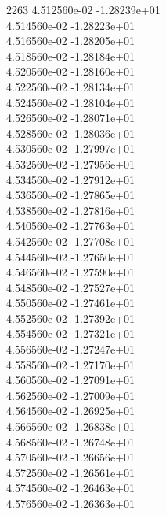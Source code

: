 2263	4.512560e-02	-1.28239e+01	\\ 	4.514560e-02	-1.28223e+01	\\ 	4.516560e-02	-1.28205e+01	\\ 	4.518560e-02	-1.28184e+01	\\ 	4.520560e-02	-1.28160e+01	\\ 	4.522560e-02	-1.28134e+01	\\ 	4.524560e-02	-1.28104e+01	\\ 	4.526560e-02	-1.28071e+01	\\ 	4.528560e-02	-1.28036e+01	\\ 	4.530560e-02	-1.27997e+01	\\ 	4.532560e-02	-1.27956e+01	\\ 	4.534560e-02	-1.27912e+01	\\ 	4.536560e-02	-1.27865e+01	\\ 	4.538560e-02	-1.27816e+01	\\ 	4.540560e-02	-1.27763e+01	\\ 	4.542560e-02	-1.27708e+01	\\ 	4.544560e-02	-1.27650e+01	\\ 	4.546560e-02	-1.27590e+01	\\ 	4.548560e-02	-1.27527e+01	\\ 	4.550560e-02	-1.27461e+01	\\ 	4.552560e-02	-1.27392e+01	\\ 	4.554560e-02	-1.27321e+01	\\ 	4.556560e-02	-1.27247e+01	\\ 	4.558560e-02	-1.27170e+01	\\ 	4.560560e-02	-1.27091e+01	\\ 	4.562560e-02	-1.27009e+01	\\ 	4.564560e-02	-1.26925e+01	\\ 	4.566560e-02	-1.26838e+01	\\ 	4.568560e-02	-1.26748e+01	\\ 	4.570560e-02	-1.26656e+01	\\ 	4.572560e-02	-1.26561e+01	\\ 	4.574560e-02	-1.26463e+01	\\ 	4.576560e-02	-1.26363e+01	\\ \hline
